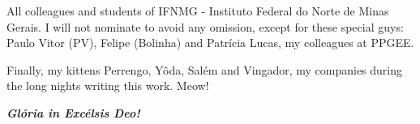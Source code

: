 \begin{agradecimentos}
All colleagues and students of IFNMG - Instituto Federal do Norte de Minas Gerais. I will not nominate to avoid any  omission, except for these special guys: Paulo Vitor (PV),  Felipe (Bolinha) and Patrícia Lucas, my colleagues at PPGEE.

Finally, my kittens Perrengo, Yôda, Salém and Vingador, my companies during the long nights writing this work. Meow!

\vspace{5cm}


\begin{center}
\textbf{\textit{Glória in Excélsis Deo!}}
\end{center}

\end{agradecimentos}